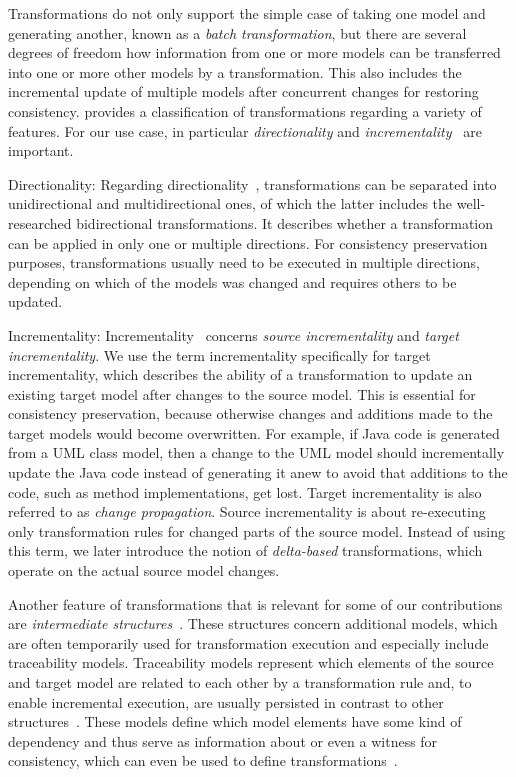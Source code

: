 Transformations do not only support the simple case of taking one model and generating another, known as a \emph{batch transformation}, but there are several degrees of freedom how information from one or more models can be transferred into one or more other models by a transformation.
This also includes the incremental update of multiple models after concurrent changes for restoring consistency.
\textcite{czarnecki2006a} provides a classification of transformations regarding a variety of features.
For our use case, in particular \emph{directionality} and \emph{incrementality}~\cite[p.~14]{czarnecki2006a} are important.
\begin{properdescription}
    \item[Directionality:] Regarding directionality~\cite[Fig.~19]{czarnecki2006a}, transformations can be separated into unidirectional and multidirectional ones, of which the latter includes the well-researched bidirectional transformations.
    It describes whether a transformation can be applied in only one or multiple directions.
    For consistency preservation purposes, transformations usually need to be executed in multiple directions, depending on which of the models was changed and requires others to be updated.
    \item[Incrementality:] Incrementality~\cite[Fig.~19]{czarnecki2006a} concerns \emph{source incrementality} and \emph{target incrementality}.
    We use the term incrementality specifically for target incrementality, which describes the ability of a transformation to update an existing target model after changes to the source model. This is essential for consistency preservation, because otherwise changes and additions made to the target models would become overwritten. For example, if Java code is generated from a \gls{UML} class model, then a change to the \gls{UML} model should incrementally update the Java code instead of generating it anew to avoid that additions to the code, such as method implementations, get lost.
    Target incrementality is also referred to as \emph{change propagation}.
    Source incrementality is about re-executing only transformation rules for changed parts of the source model.
    Instead of using this term, we later introduce the notion of \emph{delta-based} transformations, which operate on the actual source model changes.
\end{properdescription}

Another feature of transformations that is relevant for some of our contributions are \emph{intermediate structures}~\cite[p.~10]{czarnecki2006a}.
These structures concern additional models, which are often temporarily used for transformation execution and especially include traceability models.
Traceability models represent which elements of the source and target model are related to each other by a transformation rule and, to enable incremental execution, are usually persisted in contrast to other structures~\cite[p.~10]{czarnecki2006a}.
These models define which model elements have some kind of dependency and thus serve as information about or even a witness for consistency, which can even be used to define transformations~\cite{diskin2017traceabilityMappings-fse}.


